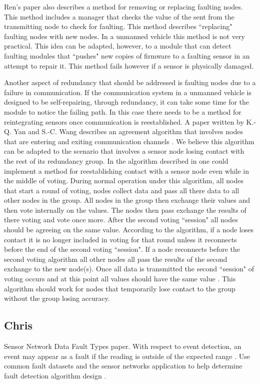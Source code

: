 \documentclass[twoside, conference]{IEEEtran}
\begin{document}
Ren's paper also describes a method for removing or replacing faulting nodes. This method includes a manager that checks the value of the sent from the transmitting node to check for faulting. This method describes ``replacing" faulting nodes with new nodes. In a unmanned vehicle this method is not very practical. This idea can be adapted, however, to a module that can detect faulting modules that ``pushes" new copies of firmware to a faulting sensor in an attempt to repair it. This method fails however if a sensor is physically damaged.\cite{Ren2001}

Another aspect of redundancy that should be addressed is faulting nodes due to a failure in communication. If the communication system in a unmanned vehicle is designed to be self-repairing, through redundancy, it can take some time for the module to notice the failing path. In this case there needs to be a method for reintegrating sensors once communication is reestablished. A paper written by K.-Q. Yan and S.-C. Wang describes an agreement algorithm that involves nodes that are entering and exiting communication channels \cite{Yan2007}. We believe this algorithm can be adapted to the scenario that involves a sensor node losing contact with the rest of its redundancy group. In the algorithm described in \cite{Yan2007} one could implement a method for reestablishing contact with a sensor node even while in the middle of voting. During normal operation under this algorithm, all nodes that start a round of voting, nodes collect data and pass all there data to all other nodes in the group. All nodes in the group then exchange their values and then vote internally on the values. The nodes then pass exchange the results of there voting and vote once more. After the second voting ``session" all nodes should be agreeing on the same value. According to the algorithm, if a node loses contact it is no longer included in voting for that round unless it reconnects before the end of the second voting ``session". If a node reconnects before the second voting algorithm all other nodes all pass the results of the second exchange to the new node(s). Once all data is transmitted the second ``session" of voting occurs and at this point all values should have the same value \cite{Yan2007}. This algorithm should work for nodes that temporarily lose contact to the group without the group losing accuracy.

\subsection{Chris}
Sensor Network Data Fault Types paper\cite{Ni2009}.  With respect to event detection, an event may appear as a fault if the reading is outside of the expected range \cite[p. 25:5]{Ni2009}.  Use common fault datasets and the sensor networks application to help determine fault detection algorithm design \cite[p. 25:7]{Ni2009}.
\end{document}

